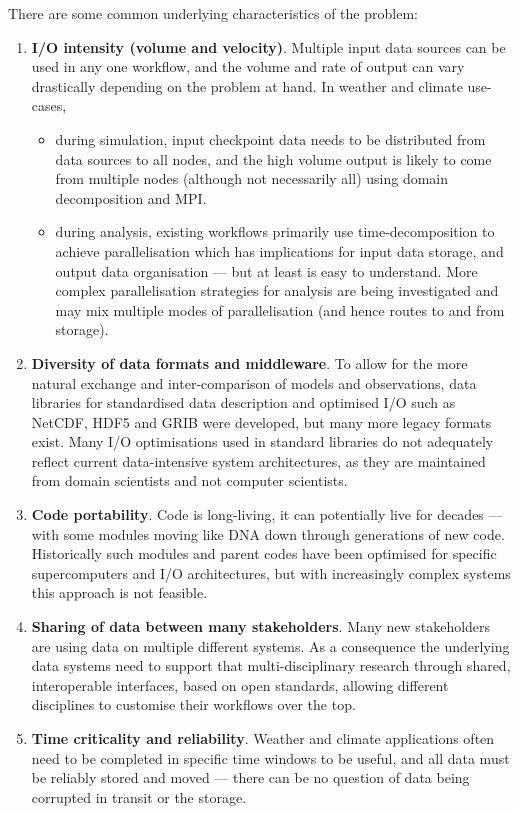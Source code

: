 There are some common underlying characteristics of the problem:
\begin{enumerate}
\item \textbf{I/O intensity (volume and velocity)}.
Multiple input data sources can be used in any one workflow, and the volume and rate of output can vary drastically depending on the problem at hand. In weather and climate use-cases,
\begin{itemize}
\item during simulation, input checkpoint data needs to be distributed from data sources to all nodes, and the high volume output is likely to come from multiple nodes (although not necessarily all) using domain decomposition and MPI.
\item during analysis, existing workflows primarily use time-decomposition to achieve parallelisation which has implications for input data storage, and output data organisation --- but at least is easy to understand. More complex parallelisation strategies for analysis are being investigated and may mix multiple modes of parallelisation (and hence routes to and from storage).
\end{itemize}

\item \textbf{Diversity of data formats and middleware}.
To allow for the more natural exchange and inter-comparison of models and observations, data libraries for standardised data description and optimised I/O such as NetCDF, HDF5 and GRIB were developed, but many more legacy formats exist.
Many I/O optimisations used in standard libraries do not adequately reflect current data-intensive system architectures, as they are maintained from
domain scientists and not computer scientists.

\item \textbf{Code portability}. Code is long-living, it can potentially live
for decades --- with some modules moving like DNA down through generations of new code. Historically such modules and parent codes have been optimised for specific supercomputers and I/O architectures, but with increasingly complex systems this approach is not feasible.
\item \textbf{Sharing of data between many stakeholders}.
Many new stakeholders are using data on multiple different systems.
As a consequence the underlying data systems need to support that multi-disciplinary research through shared, interoperable interfaces, based on open standards, allowing different disciplines to customise their workflows over the top.

\item \textbf{Time criticality and reliability}. Weather and climate applications
often need to be completed in specific time windows to be useful, and all
data must be reliably stored and moved --- there can be no question of
data being corrupted in transit or the storage.

\end{enumerate}

